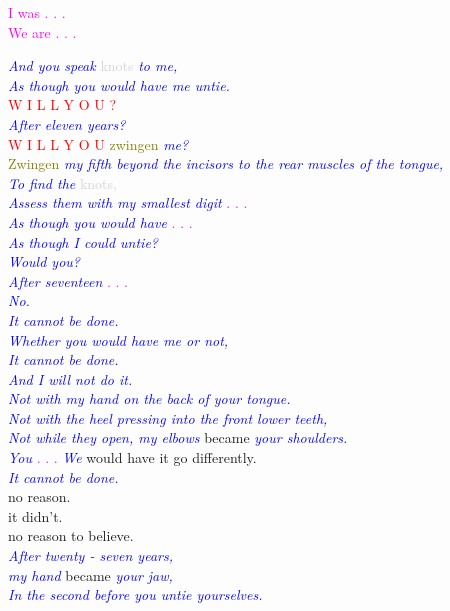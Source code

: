 \documentclass[11pt]{article}
\begin{document}
\begingroup
\begin{center}
\textcolor{magenta}{I was . . . \\ We are . . .} 
\end{center}
\endgroup

\begingroup
\begin{center}
\textit{\textcolor{blue}{And you speak}} \textcolor{lightgray}{knots} \textit{\textcolor{blue}{to me, \\ As though you would have me untie.\\}} \textcolor{red}{W I L L \hspace{10mm} Y O U ?} \\ \textit{\textcolor{blue}{After eleven years? \\}} \textcolor{red}{W I L L \hspace{10mm} Y O U \hspace{10mm}} \textcolor{olive}{zwingen} \textit{\textcolor{blue}{me? \\}} \textcolor{olive}{Zwingen} \textit{\textcolor{blue}{my fifth beyond the incisors to the rear muscles of the tongue, \\ To find the}} \textcolor{lightgray}{knots,} \textit{\textcolor{blue}{\\ Assess them with my smallest digit}} \textcolor{magenta}{. . . \\} \textit{\textcolor{blue}{As though you would have}} \textcolor{magenta}{. . . \\} \textit{\textcolor{blue}{As though I could untie? \\ Would you? \\ After seventeen}} \textcolor{magenta}{. . . \\} \textit{\textcolor{blue}{No. \\ It cannot be done. \\ Whether you would have me or not, \\ It cannot be done. \\ And I will not do it. \\ Not with my hand on the back of your tongue. \\ Not with the heel pressing into the front lower teeth, \\ Not while they open, my elbows}} became \textit{\textcolor{blue}{your shoulders. \\ You}} \textcolor{magenta}{. . .} \textit{\textcolor{blue}{We}} would have it go differently. \\ \textit{\textcolor{blue}{It cannot be done. \\}} no reason. \\ it didn't. \\ no reason to believe. \\ \textit{\textcolor{blue}{After twenty - seven years, \\ my hand}} became \textit{\textcolor{blue}{your jaw, \\ In the second before you untie yourselves.}}
\end{center}
\endgroup
\end{document}
